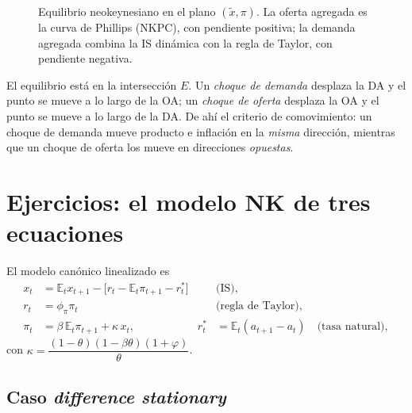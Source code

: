 \documentclass[11pt]{article}
\theoremstyle{definition}
\newcommand{\E}{\mathbb{E}}
\begin{document}
\begin{figure}[h]
\centering
{}
\caption{Equilibrio neokeynesiano en el plano $(\tilde{x},\pi)$. La oferta agregada es la curva de
Phillips (NKPC), con pendiente positiva; la demanda agregada combina la IS dinámica con la regla de
Taylor, con pendiente negativa.}
\end{figure}

El equilibrio está en la intersección $E$. Un \emph{choque de demanda} desplaza la DA y el punto se
mueve a lo largo de la OA; un \emph{choque de oferta} desplaza la OA y el punto se mueve a lo largo de
la DA. De ahí el criterio de comovimiento: un choque de demanda mueve producto e inflación en la
\emph{misma} dirección, mientras que un choque de oferta los mueve en direcciones \emph{opuestas}.

\section{Ejercicios: el modelo NK de tres ecuaciones}

El modelo canónico linealizado es
\begin{align}
x_{t}&=\E_{t}x_{t+1}-\big[r_{t}-\E_{t}\pi_{t+1}-r_{t}^{\ast}\big] & &\text{(IS)},\\
r_{t}&=\phi_{\pi}\pi_{t} & &\text{(regla de Taylor)},\\
\pi_{t}&=\beta\,\E_{t}\pi_{t+1}+\kappa\,x_{t}, & r_{t}^{\ast}&=\E_{t}(a_{t+1}-a_{t})\quad\text{(tasa natural)},
\end{align}
con $\kappa=\dfrac{(1-\theta)(1-\beta\theta)(1+\varphi)}{\theta}$.

\subsection{Caso \emph{difference stationary}}
\end{document}

